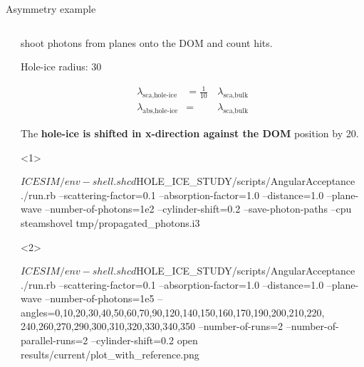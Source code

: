 
\begin{frame}[fragile]{Asymmetry example}

  \begin{columns}
    \begin{column}{0.5\textwidth}


    \end{column}
    \begin{column}{0.5\textwidth}

      \only<2>{For each angle $\eta \in [0;2\,\pi[$,}
      shoot photons from planes onto the DOM and count hits.

      \small{Hole-ice radius: 30\cm}

      \begin{equation*}\begin{align}
        \lambda_\text{sca,hole-ice} &= \frac{1}{10}\, & \lambda_\text{sca,bulk} \\
        \lambda_\text{abs,hole-ice} &= & \lambda_\text{sca,bulk}
      \end{align}\end{equation*}

      The \textbf{hole-ice is shifted in x-direction against the DOM} position by 20\cm.

      \begin{onlyenv}<1>
        \begin{bash}
          $ICESIM/env-shell.sh
          cd $HOLE_ICE_STUDY/scripts/AngularAcceptance
          ./run.rb --scattering-factor=0.1 --absorption-factor=1.0 --distance=1.0 --plane-wave --number-of-photons=1e2 --cylinder-shift=0.2 --save-photon-paths --cpu
          steamshovel tmp/propagated_photons.i3
        \end{bash}
      \end{onlyenv}

      \begin{onlyenv}<2>
        \begin{smallbash}
          $ICESIM/env-shell.sh
          cd $HOLE_ICE_STUDY/scripts/AngularAcceptance
          ./run.rb --scattering-factor=0.1 --absorption-factor=1.0 --distance=1.0 --plane-wave --number-of-photons=1e5 --angles=0,10,20,30,40,50,60,70,90,120,140,150,160,170,190,200,210,220, 240,260,270,290,300,310,320,330,340,350 --number-of-runs=2 --number-of-parallel-runs=2 --cylinder-shift=0.2
          open results/current/plot_with_reference.png
        \end{smallbash}
      \end{onlyenv}

    \end{column}
  \end{columns}


\end{frame}

